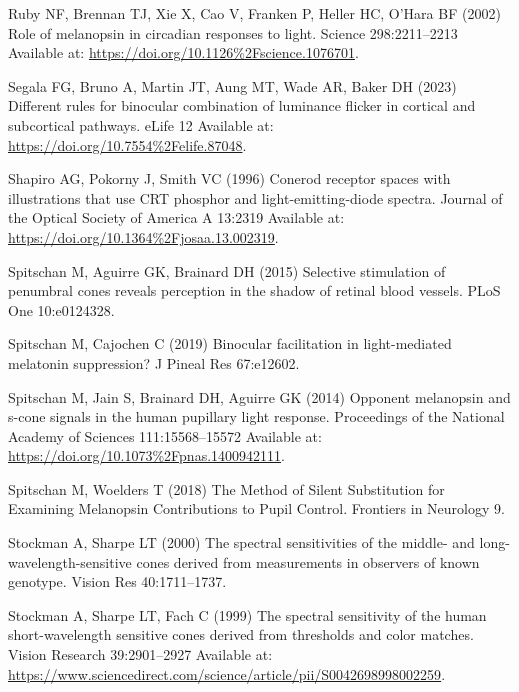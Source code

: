 \documentclass[
]{article}
\begin{document}
\leavevmode\hypertarget{ref-Ruby2002}{}%
Ruby NF, Brennan TJ, Xie X, Cao V, Franken P, Heller HC, O'Hara BF (2002) Role of melanopsin in circadian responses to light. Science 298:2211--2213 Available at: \url{https://doi.org/10.1126\%2Fscience.1076701}.

\leavevmode\hypertarget{ref-Segala2023}{}%
Segala FG, Bruno A, Martin JT, Aung MT, Wade AR, Baker DH (2023) Different rules for binocular combination of luminance flicker in cortical and subcortical pathways. eLife 12 Available at: \url{https://doi.org/10.7554\%2Felife.87048}.

\leavevmode\hypertarget{ref-Shapiro1996}{}%
Shapiro AG, Pokorny J, Smith VC (1996) Conerod receptor spaces with illustrations that use CRT phosphor and light-emitting-diode spectra. Journal of the Optical Society of America A 13:2319 Available at: \url{https://doi.org/10.1364\%2Fjosaa.13.002319}.

\leavevmode\hypertarget{ref-Spitschan2015}{}%
Spitschan M, Aguirre GK, Brainard DH (2015) Selective stimulation of penumbral cones reveals perception in the shadow of retinal blood vessels. PLoS One 10:e0124328.

\leavevmode\hypertarget{ref-Spitschan2019}{}%
Spitschan M, Cajochen C (2019) Binocular facilitation in light-mediated melatonin suppression? J Pineal Res 67:e12602.

\leavevmode\hypertarget{ref-Spitschan2014}{}%
Spitschan M, Jain S, Brainard DH, Aguirre GK (2014) Opponent melanopsin and s-cone signals in the human pupillary light response. Proceedings of the National Academy of Sciences 111:15568--15572 Available at: \url{https://doi.org/10.1073\%2Fpnas.1400942111}.

\leavevmode\hypertarget{ref-Spitschan2018}{}%
Spitschan M, Woelders T (2018) The Method of Silent Substitution for Examining Melanopsin Contributions to Pupil Control. Frontiers in Neurology 9.

\leavevmode\hypertarget{ref-Stockman2000}{}%
Stockman A, Sharpe LT (2000) The spectral sensitivities of the middle- and long-wavelength-sensitive cones derived from measurements in observers of known genotype. Vision Res 40:1711--1737.

\leavevmode\hypertarget{ref-Stockman1999}{}%
Stockman A, Sharpe LT, Fach C (1999) The spectral sensitivity of the human short-wavelength sensitive cones derived from thresholds and color matches. Vision Research 39:2901--2927 Available at: \url{https://www.sciencedirect.com/science/article/pii/S0042698998002259}.
\end{document}
